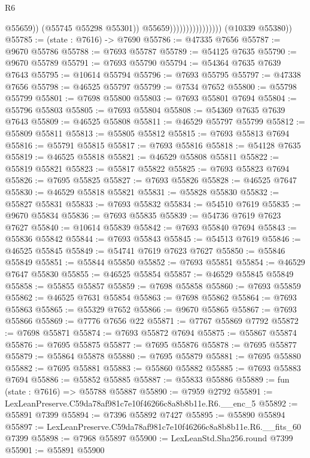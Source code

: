\begin{lexlean}{R6}
\begin{coremodule}
                                            @55659))
                                        (@55745 @55298 @55301))
                                      @55659))))))))))))))))
      (@10339 @55380))
@55785 := (state : @7616) -> @7690
@55786 := @47335 @7656
@55787 := @9670 @55786
@55788 := @7693 @55787
@55789 := @54125 @7635
@55790 := @9670 @55789
@55791 := @7693 @55790
@55794 := @54364 @7635 @7639 @7643
@55795 := @10614 @55794
@55796 := @7693 @55795
@55797 := @47338 @7656
@55798 := @46525 @55797
@55799 := @7534 @7652
@55800 := @55798 @55799
@55801 := @7698 @55800
@55803 := @7693 @55801 @7694
@55804 := @55796 @55803
@55805 := @7693 @55804
@55808 := @54369 @7635 @7639 @7643
@55809 := @46525 @55808
@55811 := @46529 @55797 @55799
@55812 := @55809 @55811
@55813 := @55805 @55812
@55815 := @7693 @55813 @7694
@55816 := @55791 @55815
@55817 := @7693 @55816
@55818 := @54128 @7635
@55819 := @46525 @55818
@55821 := @46529 @55808 @55811
@55822 := @55819 @55821
@55823 := @55817 @55822
@55825 := @7693 @55823 @7694
@55826 := @7695 @55825
@55827 := @7693 @55826
@55828 := @46525 @7647
@55830 := @46529 @55818 @55821
@55831 := @55828 @55830
@55832 := @55827 @55831
@55833 := @7693 @55832
@55834 := @54510 @7619
@55835 := @9670 @55834
@55836 := @7693 @55835
@55839 := @54736 @7619 @7623 @7627
@55840 := @10614 @55839
@55842 := @7693 @55840 @7694
@55843 := @55836 @55842
@55844 := @7693 @55843
@55845 := @54513 @7619
@55846 := @46525 @55845
@55849 := @54741 @7619 @7623 @7627
@55850 := @55846 @55849
@55851 := @55844 @55850
@55852 := @7693 @55851
@55854 := @46529 @7647 @55830
@55855 := @46525 @55854
@55857 := @46529 @55845 @55849
@55858 := @55855 @55857
@55859 := @7698 @55858
@55860 := @7693 @55859
@55862 := @46525 @7631 @55854
@55863 := @7698 @55862
@55864 := @7693 @55863
@55865 := @55329 @7652
@55866 := @9670 @55865
@55867 := @7693 @55866
@55869 := @7776 @7656 @22
@55871 := @7767 @55869 @7792
@55872 := @7698 @55871
@55874 := @7693 @55872 @7694
@55875 := @55867 @55874
@55876 := @7695 @55875
@55877 := @7695 @55876
@55878 := @7695 @55877
@55879 := @55864 @55878
@55880 := @7695 @55879
@55881 := @7695 @55880
@55882 := @7695 @55881
@55883 := @55860 @55882
@55885 := @7693 @55883 @7694
@55886 := @55852 @55885
@55887 := @55833 @55886
@55889 := fun (state : @7616) => @55788 @55887
@55890 := @7959 @2792
@55891 := LexLeanPreserve.C59da78af981c7e10f46266c8a8b8b11e.R6.__enc_5
@55892 := @55891 @7399
@55894 := @7396 @55892 @7427
@55895 := @55890 @55894
@55897 := LexLeanPreserve.C59da78af981c7e10f46266c8a8b8b11e.R6.__fits_60 @7399
@55898 := @7968 @55897
@55900 := LexLeanStd.Sha256.round @7399
@55901 := @55891 @55900

\end{coremodule}
\end{lexlean}

